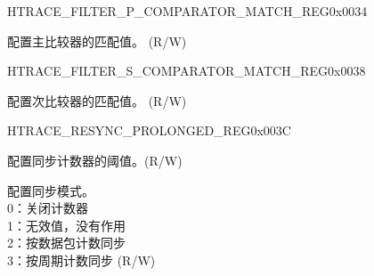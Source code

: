 \begin{register}{H}{TRACE\_FILTER\_P\_COMPARATOR\_MATCH\_REG}{0x0034}\label{regdesc:TRACEFILTERPCOMPARATORMATCHREG}
%
\regnewline%
\begin{regdesc}\begin{reglist}
\label{fielddesc:TRACEPMATCH}\item [TRACE\_P\_MATCH] 配置主比较器的匹配值。 (R/W)
\end{reglist}\end{regdesc}
\end{register}


\begin{register}{H}{TRACE\_FILTER\_S\_COMPARATOR\_MATCH\_REG}{0x0038}\label{regdesc:TRACEFILTERSCOMPARATORMATCHREG}
%
\regnewline%
\begin{regdesc}\begin{reglist}
\label{fielddesc:TRACESMATCH}\item [TRACE\_S\_MATCH] 配置次比较器的匹配值。 (R/W)
\end{reglist}\end{regdesc}
\end{register}


\begin{register}{H}{TRACE\_RESYNC\_PROLONGED\_REG}{0x003C}\label{regdesc:TRACERESYNCPROLONGEDREG}
%
%
%
\regnewline%
\begin{regdesc}\begin{reglist}
\label{fielddesc:TRACERESYNCPROLONGED}\item [TRACE\_RESYNC\_PROLONGED] 配置同步计数器的阈值。(R/W)
\label{fielddesc:TRACERESYNCMODE}\item [TRACE\_RESYNC\_MODE] 配置同步模式。\\0：关闭计数器\\1：无效值，没有作用\\2：按数据包计数同步\\3：按周期计数同步 (R/W)
\end{reglist}\end{regdesc}
\end{register}


